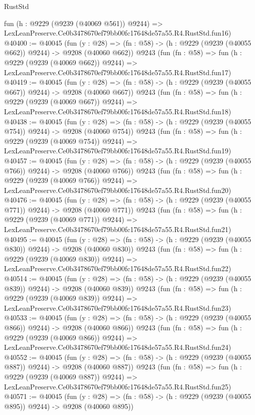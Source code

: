 \begin{lexlean}{RustStd}
\begin{coremodule}
    fun (h : @9229 (@9239 (@40069 @561)) @9244) =>
    LexLeanPreserve.Ce0b3478670ef79bb00fc17648de57a55.R4.RustStd.fun16)
@40400 := @40045
    (fun (y : @28) => (fn : @58) -> (h : @9229 (@9239 (@40055 @662)) @9244) -> @9208 (@40060 @662))
    @9243
    (fun (fn : @58) =>
    fun (h : @9229 (@9239 (@40069 @662)) @9244) =>
    LexLeanPreserve.Ce0b3478670ef79bb00fc17648de57a55.R4.RustStd.fun17)
@40419 := @40045
    (fun (y : @28) => (fn : @58) -> (h : @9229 (@9239 (@40055 @667)) @9244) -> @9208 (@40060 @667))
    @9243
    (fun (fn : @58) =>
    fun (h : @9229 (@9239 (@40069 @667)) @9244) =>
    LexLeanPreserve.Ce0b3478670ef79bb00fc17648de57a55.R4.RustStd.fun18)
@40438 := @40045
    (fun (y : @28) => (fn : @58) -> (h : @9229 (@9239 (@40055 @754)) @9244) -> @9208 (@40060 @754))
    @9243
    (fun (fn : @58) =>
    fun (h : @9229 (@9239 (@40069 @754)) @9244) =>
    LexLeanPreserve.Ce0b3478670ef79bb00fc17648de57a55.R4.RustStd.fun19)
@40457 := @40045
    (fun (y : @28) => (fn : @58) -> (h : @9229 (@9239 (@40055 @766)) @9244) -> @9208 (@40060 @766))
    @9243
    (fun (fn : @58) =>
    fun (h : @9229 (@9239 (@40069 @766)) @9244) =>
    LexLeanPreserve.Ce0b3478670ef79bb00fc17648de57a55.R4.RustStd.fun20)
@40476 := @40045
    (fun (y : @28) => (fn : @58) -> (h : @9229 (@9239 (@40055 @771)) @9244) -> @9208 (@40060 @771))
    @9243
    (fun (fn : @58) =>
    fun (h : @9229 (@9239 (@40069 @771)) @9244) =>
    LexLeanPreserve.Ce0b3478670ef79bb00fc17648de57a55.R4.RustStd.fun21)
@40495 := @40045
    (fun (y : @28) => (fn : @58) -> (h : @9229 (@9239 (@40055 @830)) @9244) -> @9208 (@40060 @830))
    @9243
    (fun (fn : @58) =>
    fun (h : @9229 (@9239 (@40069 @830)) @9244) =>
    LexLeanPreserve.Ce0b3478670ef79bb00fc17648de57a55.R4.RustStd.fun22)
@40514 := @40045
    (fun (y : @28) => (fn : @58) -> (h : @9229 (@9239 (@40055 @839)) @9244) -> @9208 (@40060 @839))
    @9243
    (fun (fn : @58) =>
    fun (h : @9229 (@9239 (@40069 @839)) @9244) =>
    LexLeanPreserve.Ce0b3478670ef79bb00fc17648de57a55.R4.RustStd.fun23)
@40533 := @40045
    (fun (y : @28) => (fn : @58) -> (h : @9229 (@9239 (@40055 @866)) @9244) -> @9208 (@40060 @866))
    @9243
    (fun (fn : @58) =>
    fun (h : @9229 (@9239 (@40069 @866)) @9244) =>
    LexLeanPreserve.Ce0b3478670ef79bb00fc17648de57a55.R4.RustStd.fun24)
@40552 := @40045
    (fun (y : @28) => (fn : @58) -> (h : @9229 (@9239 (@40055 @887)) @9244) -> @9208 (@40060 @887))
    @9243
    (fun (fn : @58) =>
    fun (h : @9229 (@9239 (@40069 @887)) @9244) =>
    LexLeanPreserve.Ce0b3478670ef79bb00fc17648de57a55.R4.RustStd.fun25)
@40571 := @40045
    (fun (y : @28) => (fn : @58) -> (h : @9229 (@9239 (@40055 @895)) @9244) -> @9208 (@40060 @895))

\end{coremodule}
\end{lexlean}
